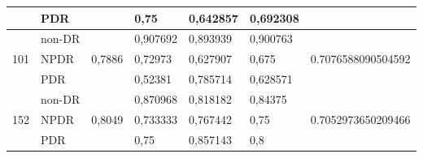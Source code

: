 \begin{table}[h!]
\begin{center}
\begin{tabular}{|c|l|c|l|l|l|c|}
                                  & PDR                        &                         & 0,75                      & 0,642857                 & 0,692308                &                                     \\ \hline
            \multirow{3}{*}{101}  & non-DR                     & \multirow{3}{*}{0,7886} & 0,907692                  & 0,893939                 & 0,900763                & \multirow{3}{*}{0.7076588090504592} \\ \cline{2-2} \cline{4-6}
                                  & NPDR                       &                         & 0,72973                   & 0,627907                 & 0,675                   &                                     \\ \cline{2-2} \cline{4-6}
                                  & PDR                        &                         & 0,52381                   & 0,785714                 & 0,628571                &                                     \\ \hline
            \multirow{3}{*}{152}  & non-DR                     & \multirow{3}{*}{0,8049} & 0,870968                  & 0,818182                 & 0,84375                 & \multirow{3}{*}{0.7052973650209466} \\ \cline{2-2} \cline{4-6}
                                  & NPDR                       &                         & 0,733333                  & 0,767442                 & 0,75                    &                                     \\ \cline{2-2} \cline{4-6}
                                  & PDR                        &                         & 0,75                      & 0,857143                 & 0,8                     &                                     \\ \hline
            \end{tabular}
        \end{center}
    \end{table}

